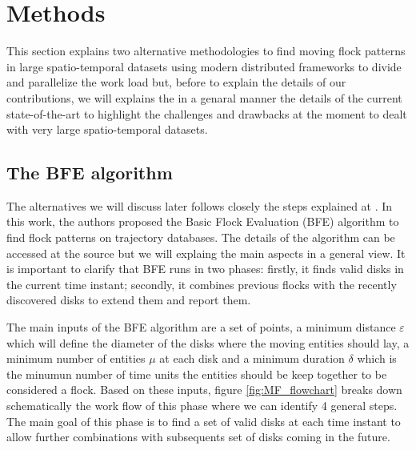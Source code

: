 \documentclass[journal,onecolumn]{IEEEtran}
\begin{document}
% 

\section{Methods}
This section explains two alternative methodologies to find moving flock patterns in large spatio-temporal datasets using modern distributed frameworks to divide and parallelize the work load but,  before to explain the details of our contributions, we will explains the in a genaral manner the details of the current state-of-the-art to highlight the challenges and drawbacks at the moment to dealt with very large spatio-temporal datasets.

\subsection{The BFE algorithm}
The alternatives we will discuss later follows closely the steps explained at \cite{vieira_2009}.  In this work, the authors proposed the Basic Flock Evaluation (BFE) algorithm to find flock patterns on trajectory databases.  The details of the algorithm can be accessed at the source but we will explaing the main aspects in a general view.  It is important to clarify that BFE runs in two phases: firstly, it finds valid disks in the current time instant; secondly, it combines previous flocks with the recently discovered disks to extend them and report them.  

The main inputs of the BFE algorithm are a set of points, a minimum distance $\varepsilon$ which will define the diameter of the disks where the moving entities should lay, a minimum number of entities $\mu$ at each disk and a minimum duration $\delta$ which is the minumun number of time units the entities should be keep together to be considered a flock.  Based on these inputs,  figure \ref{fig:MF_flowchart} breaks down schematically the work flow  of this phase where we can identify 4 general steps.  The main goal of this phase is to find a set of valid disks at each time instant to allow further combinations with subsequents set of disks coming in the future.
\end{document}
